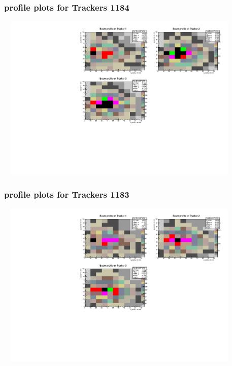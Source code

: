 \documentclass[slidestop,compress,mathserif]{beamer}
\begin{document}
\begin{frame}\frametitle{profile plots for Trackers 1184}
	 \includegraphics[width=12cm,height=8cm]{profile_plots_for_Trackers_1184.pdf}
\end{frame}
\begin{frame}\frametitle{profile plots for Trackers 1183}
	 \includegraphics[width=12cm,height=8cm]{profile_plots_for_Trackers_1183.pdf}
\end{frame}
\end{document}
